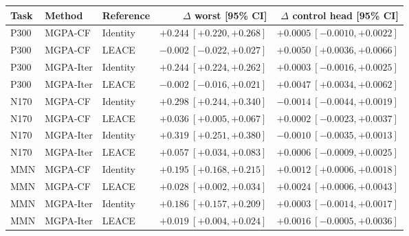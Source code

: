 \begingroup\small\setlength{\tabcolsep}{4pt}
\begin{tabular*}{\textwidth}{@{\extracolsep{\fill}}lllrr@{}}
\toprule
Task & Method & Reference & $\Delta$ worst [95\% CI] & $\Delta$ control head [95\% CI] \\
\midrule
P300 & MGPA-CF & Identity & $+0.244\ [+0.220, +0.268]$ & $+0.0005\ [-0.0010, +0.0022]$ \\
P300 & MGPA-CF & LEACE & $-0.002\ [-0.022, +0.027]$ & $+0.0050\ [+0.0036, +0.0066]$ \\
P300 & MGPA-Iter & Identity & $+0.244\ [+0.224, +0.262]$ & $+0.0003\ [-0.0016, +0.0025]$ \\
P300 & MGPA-Iter & LEACE & $-0.002\ [-0.016, +0.021]$ & $+0.0047\ [+0.0034, +0.0062]$ \\
N170 & MGPA-CF & Identity & $+0.298\ [+0.244, +0.340]$ & $-0.0014\ [-0.0044, +0.0019]$ \\
N170 & MGPA-CF & LEACE & $+0.036\ [+0.005, +0.067]$ & $+0.0002\ [-0.0023, +0.0037]$ \\
N170 & MGPA-Iter & Identity & $+0.319\ [+0.251, +0.380]$ & $-0.0010\ [-0.0035, +0.0013]$ \\
N170 & MGPA-Iter & LEACE & $+0.057\ [+0.034, +0.083]$ & $+0.0006\ [-0.0009, +0.0025]$ \\
MMN & MGPA-CF & Identity & $+0.195\ [+0.168, +0.215]$ & $+0.0012\ [+0.0006, +0.0018]$ \\
MMN & MGPA-CF & LEACE & $+0.028\ [+0.002, +0.034]$ & $+0.0024\ [+0.0006, +0.0043]$ \\
MMN & MGPA-Iter & Identity & $+0.186\ [+0.157, +0.209]$ & $+0.0003\ [-0.0014, +0.0017]$ \\
MMN & MGPA-Iter & LEACE & $+0.019\ [+0.004, +0.024]$ & $+0.0016\ [-0.0005, +0.0036]$ \\
\bottomrule
\end{tabular*}\endgroup
